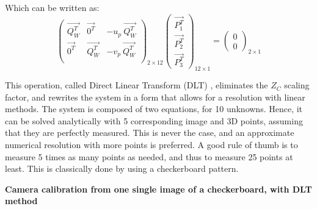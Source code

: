   Which can be written as:
  \begin{equation}\label{eq:calib}
    \boxed{
      \begin{pmatrix}
        \overrightarrow{Q_W^T} & \overrightarrow{0^T} & - u_p \ \overrightarrow{Q_W^T}\\   
        \overrightarrow{0^T} & \overrightarrow{Q_W^T} & - v_p \ \overrightarrow{Q_W^T} \\ 
      \end{pmatrix}_{\!\!2\times 12}
      \begin{pmatrix} \overrightarrow{P_1^T} \\ \overrightarrow{P_2^T} \\ \overrightarrow{P_3^T} \end{pmatrix}_{\!\!12\times 1}
      = \begin{pmatrix} 0 \\ 0 \end{pmatrix}_{\!\!2\times 1}
    }
  \end{equation}

This operation, called Direct Linear Transform (DLT) \cite{Sutherland1974}, eliminates the $Z_C$ scaling factor, and rewrites the system in a form that allows for a resolution with linear methods. The system is composed of two equations, for 10 unknowns. Hence, it can be solved analytically with 5 corresponding image and 3D points, assuming that they are perfectly measured. This is never the case, and an approximate numerical resolution with more points is preferred. A good rule of thumb is to measure 5 times as many points as needed, and thus to measure 25 points at least. This is classically done by using a checkerboard pattern. 

\vspace*{0.5cm}
\noindent\textbf{Camera calibration from one single image of a checkerboard, with DLT method}

